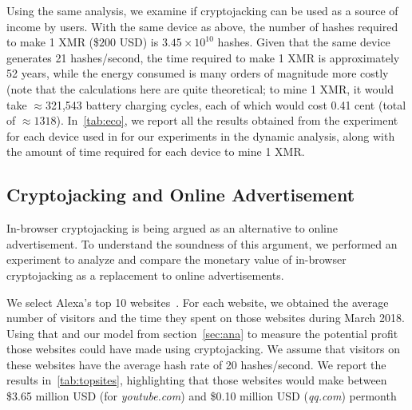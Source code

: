 \documentclass[acmlarge]{acmart}
\newcommand{\cj}{cryptojacking\xspace}
\begin{document}
Using the same analysis, we examine if \cj can be used as a source of income by users. With the same device as above, the number of hashes required to make 1 XMR (\$$200$ USD) is  $3.45 \times 10^{10}$ hashes. Given that the same device generates 21 hashes/second, the time required to make 1 XMR is approximately 52 years, while the energy consumed is many orders of magnitude more costly (note that the calculations here are quite theoretical; to mine 1 XMR, it would take $\approx$321,543 battery charging cycles, each of which would cost  0.41 cent (total of $\approx 1318$). In~\autoref{tab:eco}, we report all the results obtained from the experiment for each device used in for our experiments in the dynamic analysis, along with the amount of time required for each device to mine 1 XMR. 




\subsection{Cryptojacking and Online Advertisement} \label{sec:mw}

In-browser \cj is being argued as an alternative to online advertisement. To understand the soundness of this argument, we performed an experiment to analyze and compare the monetary value of in-browser \cj as a replacement to online advertisements. 

We select Alexa's top 10 websites~\cite{Alexa-18}. For each website, we obtained the average number of visitors and the time they spent on those websites during March 2018. Using that and our model from section~\ref{sec:ana} to measure the potential profit those websites could have made using \cj. We assume that visitors on these websites have the average hash rate of 20 hashes/second. We report the results in~\autoref{tab:topsites}, highlighting that those websites would make between \$3.65 million USD (for \textit{youtube.com}) and \$0.10 million USD (\textit{qq.com}) permonth
\end{document}
